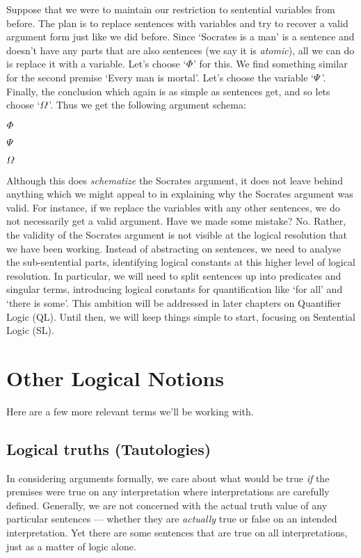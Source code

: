 Suppose that we were to maintain our restriction to sentential variables from before.
The plan is to replace sentences with variables and try to recover a valid argument form just like we did before.
Since `Socrates is a man' is a sentence and doesn't have any parts that are also sentences (we say it is \textit{atomic}), all we can do is replace it with a variable.
Let's choose `$\varPhi{}$' for this. 
We find something similar for the second premise `Every man is mortal'.
Let's choose the variable `$\varPsi{}$'.
Finally, the conclusion which again is as simple as sentences get, and so lets choose `$\varOmega{}$'.
Thus we get the following argument schema:

\begin{earg}
  \item $\varPhi{}$
  \item $\varPsi{}$
  \item[\therefore] $\varOmega{}$
\end{earg}

Although this does \textit{schematize} the Socrates argument, it does not leave behind anything which we might appeal to in explaining why the Socrates argument was valid.
For instance, if we replace the variables with any other sentences, we do not necessarily get a valid argument.
Have we made some mistake?
No.
Rather, the validity of the Socrates argument is not visible at the logical resolution that we have been working.
Instead of abstracting on sentences, we need to analyse the sub-sentential parts, identifying logical constants at this higher level of logical resolution.
In particular, we will need to split sentences up into predicates and singular terms, introducing logical constants for quantification like `for all' and `there is some'.
This ambition will be addressed in later chapters on Quantifier Logic (QL).
Until then, we will keep things simple to start, focusing on Sentential Logic (SL).





\section{Other Logical Notions}

Here are a few more relevant terms we'll be working with.

\subsection{Logical truths (Tautologies)}
\label{sec-tautologydef}
In considering arguments formally, we care about what would be true \emph{if} the premises were true on any interpretation where interpretations are carefully defined. 
Generally, we are not concerned with the actual truth value of any particular sentences --- whether they are \emph{actually} true or false on an intended interpretation.
Yet there are some sentences that are true on all interpretations, just as a matter of logic alone.

